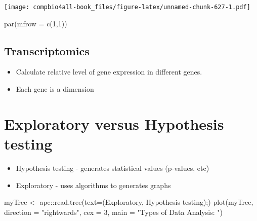 \documentclass[
]{book}
\newenvironment{Shaded}{\begin{snugshade}}{\end{snugshade}}
\newcommand{\AttributeTok}[1]{\textcolor[rgb]{0.77,0.63,0.00}{#1}}
\newcommand{\DecValTok}[1]{\textcolor[rgb]{0.00,0.00,0.81}{#1}}
\newcommand{\FunctionTok}[1]{\textcolor[rgb]{0.00,0.00,0.00}{#1}}
\newcommand{\NormalTok}[1]{#1}
\newcommand{\OtherTok}[1]{\textcolor[rgb]{0.56,0.35,0.01}{#1}}
\newcommand{\SpecialCharTok}[1]{\textcolor[rgb]{0.00,0.00,0.00}{#1}}
\newcommand{\StringTok}[1]{\textcolor[rgb]{0.31,0.60,0.02}{#1}}
\providecommand{\tightlist}{%
  \setlength{\itemsep}{0pt}\setlength{\parskip}{0pt}}
\begin{document}
\texttt{[image: compbio4all-book\_files/figure-latex/unnamed-chunk-627-1.pdf]}

\begin{Shaded}
\begin{Highlighting}[]
\FunctionTok{par}\NormalTok{(}\AttributeTok{mfrow =} \FunctionTok{c}\NormalTok{(}\DecValTok{1}\NormalTok{,}\DecValTok{1}\NormalTok{))}
\end{Highlighting}
\end{Shaded}

\hypertarget{transcriptomics}{%
\subsection{Transcriptomics}\label{transcriptomics}}

\begin{itemize}
\tightlist
\item
  Calculate relative level of gene expression in different genes.
\item
  Each gene is a dimension
\end{itemize}

\hypertarget{exploratory-versus-hypothesis-testing}{%
\section{Exploratory versus Hypothesis testing}\label{exploratory-versus-hypothesis-testing}}

\begin{itemize}
\tightlist
\item
  Hypothesis testing - generates statistical values (p-values, etc)
\item
  Exploratory - uses algorithms to generates graphs
\end{itemize}

\begin{Shaded}
\begin{Highlighting}[]
\NormalTok{myTree }\OtherTok{\textless{}{-}}\NormalTok{ ape}\SpecialCharTok{::}\FunctionTok{read.tree}\NormalTok{(}\AttributeTok{text=}\StringTok{\textquotesingle{}(Exploratory, Hypothesis{-}testing);\textquotesingle{}}\NormalTok{)}
\FunctionTok{plot}\NormalTok{(myTree, }\AttributeTok{direction =} \StringTok{"rightwards"}\NormalTok{, }\AttributeTok{cex =} \DecValTok{3}\NormalTok{,}
     \AttributeTok{main =} \StringTok{"Types of Data Analysis: "}\NormalTok{)}
\end{Highlighting}
\end{Shaded}
\end{document}
